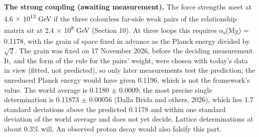 \documentclass[
  11pt,
]{article}
\begin{document}
\textbf{The strong coupling (awaiting measurement).} The force strengths meet at 4.6 \ensuremath{\times} 10\textsuperscript{13} GeV if the three colourless far-side weak pairs of the relationship matrix sit at 2.4 \ensuremath{\times} 10\textsuperscript{8} GeV (Section 10). At three loops this requires \ensuremath{\alpha}\textsubscript{s}(M\textsubscript{Z}) = 0.1178, with the grain of space fixed in advance as the Planck energy divided by \ensuremath{\sqrt{2}}. The grain was fixed on 17 November 2026, before the deciding measurement. It, and the form of the rule for the pairs' weight, were chosen with today's data in view (fitted, not predicted), so only later measurements test the prediction; the unreduced Planck energy would have given 0.1196, which is not the framework's value. The world average is 0.1180 \ensuremath{\pm} 0.0009; the most precise single determination is 0.11873 \ensuremath{\pm} 0.00056 (Dalla Brida and others, 2026), which lies 1.7 standard deviations above the predicted 0.1178 and within one standard deviation of the world average and does not yet decide. Lattice determinations at about 0.3\% will. An observed proton decay would also falsify this part.
\end{document}

